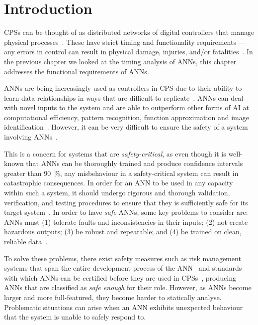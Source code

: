 \section{Introduction}
\label{sec:intro2}

\acp{CPS} can be thought of as distributed networks of digital controllers that manage physical processes~\cite{alur2015principles}. 
These have strict timing and functionality requirements --- any errors in control can result in physical damage, injuries, and/or fatalities~\cite{ANNDevModel1999}. 
In the previous chapter we looked at the timing analysis of \acp{ANN}, this chapter addresses the functional requirements of \acp{ANN}.

\acp{ANN} are being increasingly used as controllers in \ac{CPS} due to their ability to learn data relationships in ways that are difficult to replicate~\cite{ANNSafety2007}. 
\acp{ANN} can deal with novel inputs to the system and are able to outperform other forms of \ac{AI} at computational efficiency, pattern recognition, function approximation and image identification~\cite{AIComp2016, AIComp2017}. 
However, it can be very difficult to ensure the safety of a system involving \acp{ANN}~\cite{ANNSafety2007, ANNSafety2018}.

This is a concern for systems that are \textit{safety-critical}, as even though it is well-known that \acp{ANN} can be thoroughly trained and produce confidence intervals greater than 90~\%, any misbehaviour in a safety-critical system can result in  catastrophic consequences.
In order for an \ac{ANN} to be used in any capacity within such a system, it should undergo rigorous and thorough validation, verification, and testing procedures to ensure that they is sufficiently safe for its target system~\cite{scann, ANNSafetyLifecycle2003}.
In order to have \textit{safe} \acp{ANN}, some key problems to consider are: \acp{ANN} must (1) tolerate faults and inconsistencies in their inputs; (2) not create hazardous outputs; (3) be robust and repeatable; and (4) be trained on clean, reliable data~\cite{EstSafeCriteria2003}.

To solve these problems, there exist safety measures such as risk management systems that span the entire development process of the \ac{ANN}~\cite{ANNDevModel1999} and standards with which \acp{ANN} can be certified before they are used in \acp{CPS}~\cite{SCANNStandard}, producing \acp{ANN} that are classified as \textit{safe enough} for their role. 
However, as \acp{ANN} become larger and more full-featured, they  become harder to statically analyse.
Problematic situations can arise when an \ac{ANN} exhibits unexpected behaviour that the system is unable to safely respond to.

